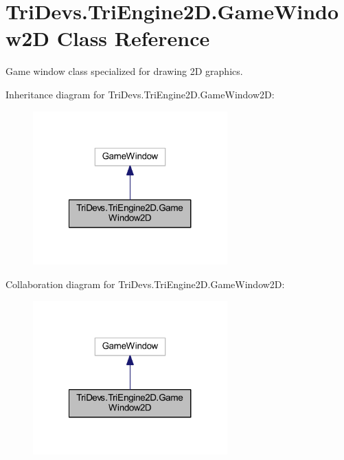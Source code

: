 \hypertarget{class_tri_devs_1_1_tri_engine2_d_1_1_game_window2_d}{\section{Tri\-Devs.\-Tri\-Engine2\-D.\-Game\-Window2\-D Class Reference}
\label{class_tri_devs_1_1_tri_engine2_d_1_1_game_window2_d}
}


Game window class specialized for drawing 2\-D graphics.  




Inheritance diagram for Tri\-Devs.\-Tri\-Engine2\-D.\-Game\-Window2\-D\-:\nopagebreak
\begin{figure}[H]
\begin{center}
\leavevmode
\includegraphics[width=212pt]{class_tri_devs_1_1_tri_engine2_d_1_1_game_window2_d__inherit__graph}
\end{center}
\end{figure}


Collaboration diagram for Tri\-Devs.\-Tri\-Engine2\-D.\-Game\-Window2\-D\-:
\nopagebreak
\begin{figure}[H]
\begin{center}
\leavevmode
\includegraphics[width=212pt]{class_tri_devs_1_1_tri_engine2_d_1_1_game_window2_d__coll__graph}
\end{center}
\end{figure}
